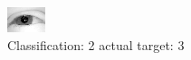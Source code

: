 \begin{figure}[h!]
\begin{center}
\includegraphics[width=0.60\columnwidth]{figures/ID2385_class_2_target_3.png}
\end{center}
\caption{ Classification: 2 actual target: 3}
\label{fig:ID2385_class_2_target_3}
\end{figure}
